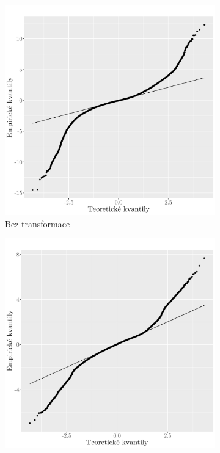 \begin{figure}
	\centering
	\begin{subfigure}{0.45\textwidth}
  \includegraphics[width=\textwidth]{img/ch2/qq_modmax15cm_none.png}
		\caption{Bez transformace}
		\label{fig:qq_none}
	\end{subfigure}
	\hfill
	\begin{subfigure}{0.45\textwidth}
  \includegraphics[width=\textwidth]{img/ch2/qq_modmax15cm_log.png}

\end{subfigure}
\end{figure}
